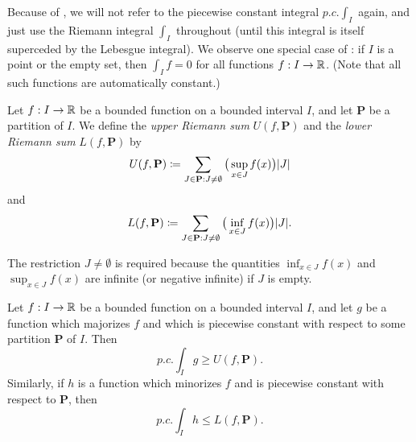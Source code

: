 \begin{rmk}\label{i:11.3.8}
  Because of , we will not refer to the piecewise constant integral \(p.c. \int_I\) again, and just use the Riemann integral \(\int_I\) throughout
  (until this integral is itself superceded by the Lebesgue integral).
  We observe one special case of :
  if \(I\) is a point or the empty set, then \(\int_I f = 0\) for all functions \(f : I \to \mathbb{R}\).
  (Note that all such functions are automatically constant.)
\end{rmk}

\begin{defn}\label{i:11.3.9}
  Let \(f : I \to \mathbb{R}\) be a bounded function on a bounded interval \(I\), and let \(\mathbf{P}\) be a partition of \(I\).
  We define the \emph{upper Riemann sum} \(U(f, \mathbf{P})\) and the \emph{lower Riemann sum} \(L(f, \mathbf{P})\) by
  \[
    U(f, \mathbf{P}) \coloneqq \sum_{J \in \mathbf{P} : J \neq \emptyset} \big(\sup_{x \in J} f(x)\big) \abs{J}
  \]
  and
  \[
    L(f, \mathbf{P}) \coloneqq \sum_{J \in \mathbf{P} : J \neq \emptyset} \big(\inf_{x \in J} f(x)\big) \abs{J}.
  \]
\end{defn}

\begin{rmk}\label{i:11.3.10}
  The restriction \(J \neq \emptyset\) is required because the quantities \(\inf_{x \in J} f(x)\) and \(\sup_{x \in J} f(x)\) are infinite (or negative infinite) if \(J\) is empty.
\end{rmk}

\begin{lem}\label{i:11.3.11}
  Let \(f : I \to \mathbb{R}\) be a bounded function on a bounded interval \(I\), and let \(g\) be a function which majorizes \(f\) and which is piecewise constant with respect to some partition \(\mathbf{P}\) of \(I\).
  Then
  \[
    p.c. \int_I g \geq U(f, \mathbf{P}).
  \]
  Similarly, if \(h\) is a function which minorizes \(f\) and is piecewise constant with respect to \(\mathbf{P}\), then
  \[
    p.c. \int_I h \leq L(f, \mathbf{P}).
  \]
\end{lem}

